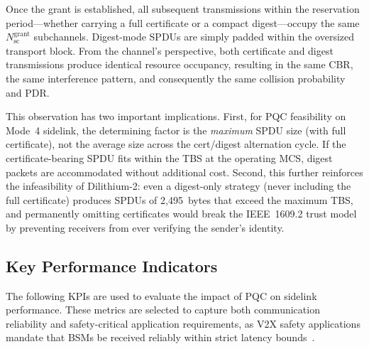\documentclass[letterpaper,journal]{IEEEtran}
\begin{document}
Once the grant is established, all subsequent transmissions within the reservation period---whether carrying a full certificate or a compact digest---occupy the same $N_\text{sc}^\text{grant}$ subchannels. Digest-mode SPDUs are simply padded within the oversized transport block. From the channel's perspective, both certificate and digest transmissions produce identical resource occupancy, resulting in the same CBR, the same interference pattern, and consequently the same collision probability and PDR.

This observation has two important implications. First, for PQC feasibility on Mode~4 sidelink, the determining factor is the \emph{maximum} SPDU size (with full certificate), not the average size across the cert/digest alternation cycle. If the certificate-bearing SPDU fits within the TBS at the operating MCS, digest packets are accommodated without additional cost. Second, this further reinforces the infeasibility of Dilithium-2: even a digest-only strategy (never including the full certificate) produces SPDUs of 2{,}495~bytes that exceed the maximum TBS, and permanently omitting certificates would break the IEEE~1609.2 trust model by preventing receivers from ever verifying the sender's identity.

\subsection{Key Performance Indicators}
\label{sec:kpis}

The following KPIs are used to evaluate the impact of PQC on sidelink performance. These metrics are selected to capture both communication reliability and safety-critical application requirements, as V2X safety applications mandate that BSMs be received reliably within strict latency bounds~\cite{sae_j29451}.
\end{document}
